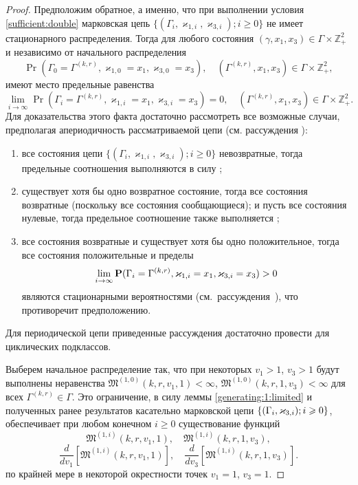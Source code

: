 \begin{proof}
Предположим обратное,  а именно,  что при выполнении условия \eqref{sufficient:double} марковская цепь $\{(\Gamma_i,  \varkappa_{1, i}, \varkappa_{3, i}); i \geqslant 0\}$ не имеет стационарного распределения. 
Тогда для любого состояния $(\gamma, x_1, x_3)\in \Gamma \times {\mathbb Z}^2_+$ и независимо от начального распределения 
$$
\Pr(\Gamma_{0}=\Gamma^{(k, r)},  \varkappa_{1, 0}=x_1,  \varkappa_{3, 0}=x_3), \quad (\Gamma^{(k, r)}, x_1, x_3)\in \Gamma \times {\mathbb Z}^2_+,
$$
имеют место предельные равенства 
\begin{equation}
\lim_{i \to \infty} \Pr(\Gamma_{i}=\Gamma^{(k, r)},  \varkappa_{1, i}=x_1,  \varkappa_{3, i}=x_3) =0,  \quad  (\Gamma^{(k, r)}, x_1, x_3)\in \Gamma \times {\mathbb Z}^2_+.
\label{zero:limit:equations:1}
\end{equation} 
Для доказательства этого факта достаточно рассмотреть все возможные случаи,  предполагая апериодичность рассматриваемой цепи (см. рассуждения \cite[гл. $3$,   \S~3-4]{Shiryaev}):
\begin{enumerate}
\item все состояния цепи $\{(\Gamma_i,  \varkappa_{1, i}, \varkappa_{3, i}); i \geqslant 0\}$ невозвратные,  тогда предельные соотношения выполняются в силу \cite[с. 541,  лемма $2$]{Shiryaev};
\item существует хотя бы одно возвратное состояние,  тогда все состояния возвратные (поскольку все состояния сообщающиеся); и пусть все состояния нулевые,  тогда предельное соотношение также выполняется \cite[с. 541,  лемма $3$]{Shiryaev};
\item все состояния возвратные и существует хотя бы одно положительное,  тогда все состояния положительные и пределы 
$$
\lim_{i \to \infty} \Pr(\Gamma_{i}\hm= \Gamma^{(k, r)},  \varkappa_{1, i}\hm= x_1,  \varkappa_{3, i}\hm= x_3) > 0
$$ являются стационарными вероятностями (см.~рассуждения~{\cite[с. 549,  теорема $1$]{Shiryaev}}),  что противоречит предположению.
\end{enumerate}
Для периодической цепи приведенные рассуждения достаточно провести для циклических подклассов.

Выберем начальное распределение так,  что при некоторых $v_1 >1$,  $v_3 >1$ будут выполнены неравенства $\mathfrak{M}^{(1, 0)}(k, r, v_1, 1) <\infty$,  $\mathfrak{M}^{(1, 0)}(k, r, 1, v_3) <\infty$ для всех $\Gamma^{(k, r)}\in \Gamma$. Это ограничение,  в силу леммы \eqref{generating:1:limited} и полученных ранее результатов касательно марковской цепи ${\MarkThree}$,  обеспечивает при любом конечном $i\geqslant 0$ существование функций 
\begin{equation}
\mathfrak{M}^{(1, i)}(k, r, v_1, 1),  \quad \mathfrak{M}^{(1, i)}(k, r, 1, v_3),
\end{equation}
\begin{equation}
\frac{d}{dv_1} \left[\mathfrak{M}^{(1, i)}(k, r, v_1, 1)\right],  \quad \frac{d}{dv_3} \left[\mathfrak{M}^{(1, i)}(k, r, 1, v_3)\right].
\end{equation}
по крайней мере в некоторой окрестности точек $v_1 = 1$,  $v_3=1$.


\end{proof}
